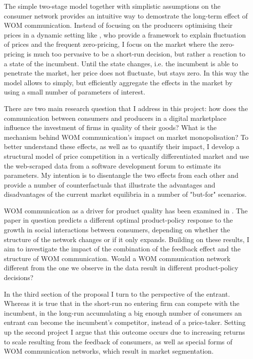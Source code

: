 \documentclass{article}
\numberwithin{figure}{section}
\numberwithin{table}{section}
\theoremstyle{indented}
\numberwithin{equation}{section} %
\begin{document}
The simple two-stage model together with simplistic assumptions on the consumer network provides an intuitive way to demostrate the long-term effect of WOM communication. Instead of focusing on the producers optimising their prices in a dynamic setting like \citet{Ajorlou2018}, who provide a framework to explain fluctuation of prices and the frequent zero-pricing, I focus on the market where the zero-pricing is much too pervasive to be a short-run decision, but rather a reaction to a state of the incumbent. Until the state changes, i.e. the incumbent is able to penetrate the market, her price does not fluctuate, but stays zero. In this way the model allows to simply, but efficiently aggregate the effects in the market by using a small number of parameters of interest.

There are two main research question that I address in this project: how does the communication between consumers and producers in a digital marketplace influence the investment of firms in quality of their goods? What is the mechanism behind WOM communication's impact on market monopolisation? To better understand these effects, as well as to quantify their impact, I develop a structural model of price competition in a vertically differentiated market and use the web-scraped data from a software development forum to estimate its parameters. My intention is to disentangle the two effects from each other and provide a number of counterfactuals that illustrate the advantages and disadvantages of the current market equilibria in a number of "but-for" scenarios. 

WOM communication as a driver for product quality has been examined in \citet{Godes2017}. The paper in question predicts a different optimal product-policy response to the growth in social interactions between consumers, depending on whether the structure of the network changes or if it only expands. Building on these results, I aim to investigate the impact of the combination of the feedback effect and the structure of WOM communication. Would a WOM communication network different from the one we observe in the data result in different product-policy decisions? 

In the third section of the proposal I turn to the perspective of the entrant. Whereas it is true that in the short-run no entering firm can compete with the incumbent, in the long-run accumulating a big enough number of consumers an entrant can become the incumbent's competitor, instead of a price-taker. Setting up the second project I argue that this outcome occurs due to increasing returns to scale resulting from the feedback of consumers, as well as special forms of WOM communication networks, which result in market segmentation. 
\end{document}
